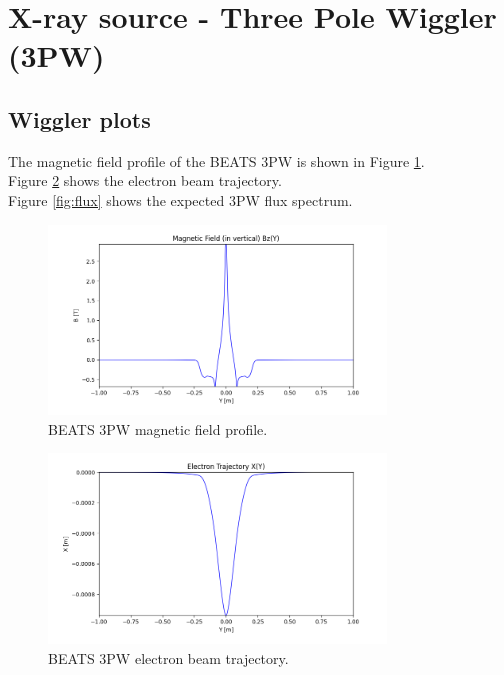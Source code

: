 \section{X-ray source - Three Pole Wiggler (3PW)}
\subsection{Wiggler plots}
The magnetic field profile of the BEATS 3PW is shown in Figure \ref{fig:Bz_y}. \\
Figure \ref{fig:electron_trajectory} shows the electron beam trajectory. \\
Figure \ref{fig:flux} shows the expected 3PW flux spectrum. \\

\begin{figure}[ht]
\centering
\includegraphics[width=0.8\textwidth]{./../../beam_snapshots/3PW/Bz_y.png}
\caption{\label{fig:Bz_y} BEATS 3PW magnetic field profile.}
\end{figure}

\begin{figure}[ht]
\centering
\includegraphics[width=0.8\textwidth]{./../../beam_snapshots/3PW/electron_trajectory.png}
\caption{\label{fig:electron_trajectory} BEATS 3PW electron beam trajectory.}
\end{figure}

